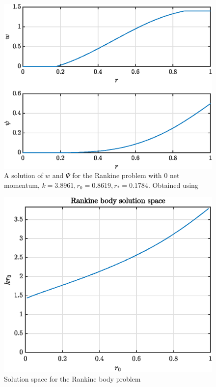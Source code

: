 \documentclass{X:/Documents/Coding/Latex/myreport}
\begin{document}
\begin{figure}[h]
    \centering
    \includegraphics[width=\linewidth]{rankineExample.eps}
    \caption{A solution of $w$ and $\Psi$ for the Rankine problem with $0$ net momentum, $k = 3.8961, r_0 = 0.8619, r_* = 0.1784$. Obtained using }
    \label{fig:rankineExample}
\end{figure}






\begin{figure}[h]
    \centering
    \includegraphics[width=\linewidth]{rankineSolutionSet.eps}
    \caption{Solution space for the Rankine body problem}
    \label{fig:rankineSolutions}
\end{figure}
\end{document}
